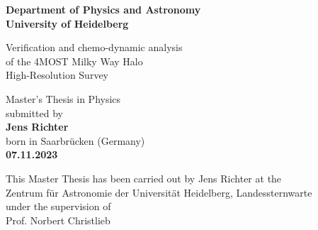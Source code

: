 \documentclass[a4paper,11pt]{article}
\begin{document}
%
\begin{titlepage}
\begin{center}

\Large\textbf{Department of Physics and Astronomy\\ University of Heidelberg}

\vspace{4cm}

\Large{Verification and chemo-dynamic analysis\\ of the 4MOST Milky Way Halo\\ High-Resolution Survey}

\vspace{7cm}

\normalsize
Master's Thesis in Physics\\ submitted by\\
\vspace{0.5cm}
\Large\textbf{Jens Richter}\\
\normalsize
\vspace{0.5cm}
born in Saarbrücken (Germany)\\
\vspace{0.5cm}
\Large\textbf{07.11.2023}
\normalsize

\vspace{3cm}

\normalsize
This Master Thesis has been carried out by Jens Richter at the\\ Zentrum für Astronomie der Universität Heidelberg, Landessternwarte\\ under the supervision of\\ Prof. Norbert Christlieb

\vfill
\end{center}
\end{titlepage}
%
\end{document}
